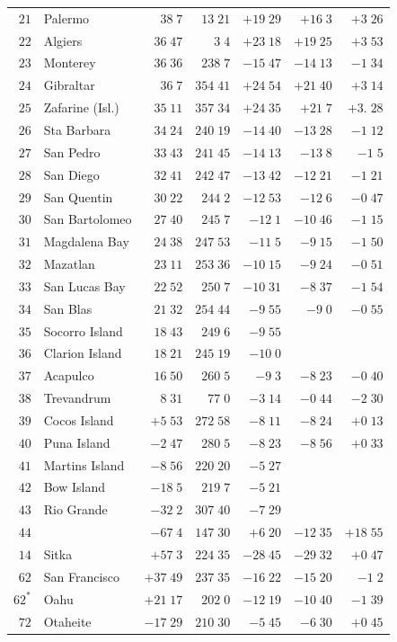 \begin{center}
\begin{tabular}{rl|r|r||r|r|r}
$21$&Palermo&$38\;7$&$13\;21$&$+19\;29$&$+16\;3$&$+3\;26$\\
$22$&Algiers&$36\;47$&$3\;4$&$+23\;18$&$+19\;25$&$+3\;53$\\
$23$&Monterey&$36\;36$&$238\;7$&$-15\;47$&$-14\;13$&$-1\;34$\\
$24$&Gibraltar&$36\;7$&$354\;41$&$+24\;54$&$+21\;40$&$+3\;14$\\
$25$&Zafarine (Isl.)&$35\;11$&$357\;34$&$+24\;35$&$+21\;7$&$+3.\;28$\\
$26$&Sta Barbara&$34\;24$&$240\;19$&$-14\;40$&$-13\;28$&$-1\;12$\\
$27$&San Pedro&$33\;43$&$241\;45$&$-14\;13$&$-13\;8$&$-1\;5$\\
$28$&San Diego&$32\;41$&$242\;47$&$-13\;42$&$-12\;21$&$-1\;21$\\
$29$&San Quentin&$30\;22$&$244\;2$&$-12\;53$&$-12\;6$&$-0\;47$\\
$30$&San Bartolomeo&$27\;40$&$245\;7$&$-12\;1$&$-10\;46$&$-1\;15$\\[2pt]
$31$&Magdalena Bay&$24\;38$&$247\;53$&$-11\;5$&$-9\;15$&$-1\;50$\\
$32$&Mazatlan&$23\;11$&$253\;36$&$-10\;15$&$-9\;24$&$-0\;51$\\
$33$&San Lucas Bay&$22\;52$&$250\;7$&$-10\;31$&$-8\;37$&$-1\;54$\\
$34$&San Blas&$21\;32$&$254\;44$&$-9\;55$&$-9\;0$&$-0\;55$\\
$35$&Socorro Island&$18\;43$&$249\;6$&$-9\;55$&&\\
$36$&Clarion Island&$18\;21$&$245\;19$&$-10\;0$&&\\
$37$&Acapulco&$16\;50$&$260\;5$&$-9\;3$&$-8\;23$&$-0\;40$\\
$38$&Trevandrum&$8\;31$&$77\;0$&$-3\;14$&$-0\;44$&$-2\;30$\\
$39$&Cocos Island&$+5\;53$&$272\;58$&$-8\;11$&$-8\;24$&$+0\;13$\\
$40$&Puna Island&$-2\;47$&$280\;5$&$-8\;23$&$-8\;56$&$+0\;33$\\[2pt]
$41$&Martins Island&$-8\;56$&$220\;20$&$-5\;27$&&\\
$42$&Bow Island&$-18\;5$&$219\;7$&$-5\;21$&&\\
$43$&Rio Grande&$-32\;2$&$307\;40$&$-7\;29$&&\\
$44$&&$-67\;4$&$147\;30$&$+6\;20$&$-12\;35$&$+18\;55$\\
$14$&Sitka&$+57\;3$&$224\;35$&$-28\;45$&$-29\;32$&$+0\;47$\\
$62$&San Francisco&$+37\;49$&$237\;35$&$-16\;22$&$-15\;20$&$-1\;2$\\
$62^{*}$&Oahu&$+21\;17$&$202\;0$&$-12\;19$&$-10\;40$&$-1\;39$\\
$72$&Otaheite&$-17\;29$&$210\;30$&$-5\;45$&$-6\;30$&$+0\;45$\\
\hline
\end{tabular}
\end{center}
